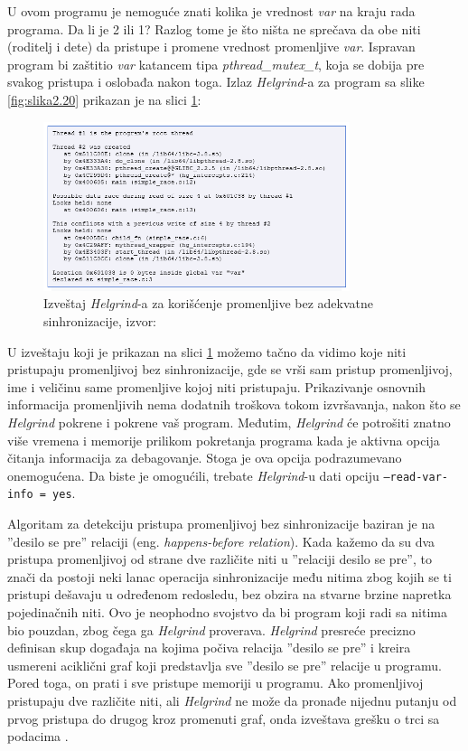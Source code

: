 \documentclass[12pt,oneside]{memoir}
\theoremstyle{plain}
\theoremstyle{definition}
\begin{document}
U ovom programu je nemoguće znati kolika je vrednost \textit{var} na kraju rada programa. Da li je 2 ili 1? Razlog tome je što ništa ne sprečava da obe niti (roditelj i dete) da pristupe i promene vrednost promenljive \textit{var}. Ispravan program bi zaštitio \textit{var} katancem tipa \textit{pthread\_mutex\_t}, koja se dobija pre svakog pristupa i oslobađa nakon toga. Izlaz \textit{Helgrind}-a za program sa slike \ref{fig:slika2.20} prikazan je na slici \ref{fig:slika2.21}:
\begin{figure}[!ht]
  \centering
  \includegraphics[width=0.8\textwidth]{DataRaceReport.png}
  \caption{Izveštaj \textit{Helgrind}-a za korišćenje promenljive bez adekvatne sinhronizacije, izvor: \cite{Helgrind}}
  \label{fig:slika2.21}
\end{figure}

U izveštaju koji je prikazan na slici \ref{fig:slika2.21} možemo tačno da vidimo koje niti pristupaju promenljivoj bez sinhronizacije, gde se vrši sam pristup promenljivoj, ime i veličinu same promenljive kojoj niti pristupaju. Prikazivanje osnovnih informacija promenljivih nema dodatnih troškova tokom izvršavanja, nakon što se \textit{Helgrind} pokrene i pokrene vaš program. Međutim, \textit{Helgrind} će potrošiti znatno više vremena i memorije prilikom pokretanja programa kada je aktivna opcija čitanja informacija za debagovanje. Stoga je ova opcija podrazumevano onemogućena. Da biste je omogućili, trebate \textit{Helgrind}-u dati opciju \texttt{--read-var-info = yes}.

Algoritam za detekciju pristupa promenljivoj bez sinhronizacije baziran je na ''desilo se pre'' relaciji (eng. \textit{happens-before relation}). Kada kažemo da su dva pristupa promenljivoj od strane dve različite niti u ''relaciji desilo se pre'', to znači da postoji neki lanac operacija sinhronizacije među nitima zbog kojih se ti pristupi dešavaju u određenom redosledu, bez obzira na stvarne brzine napretka pojedinačnih niti. Ovo je neophodno svojstvo da bi program koji radi sa nitima bio pouzdan, zbog čega ga \textit{Helgrind} proverava. \textit{Helgrind} presreće precizno definisan skup događaja na kojima počiva relacija ''desilo se pre'' i kreira usmereni aciklični graf koji predstavlja sve ''desilo se pre'' relacije u programu. Pored toga, on prati i sve pristupe memoriji u programu. Ako promenljivoj pristupaju dve različite niti, ali \textit{Helgrind} ne može da pronađe nijednu putanju od prvog pristupa do drugog kroz promenuti graf, onda izveštava grešku o trci sa podacima \cite{Helgrind}.  
\end{document}
